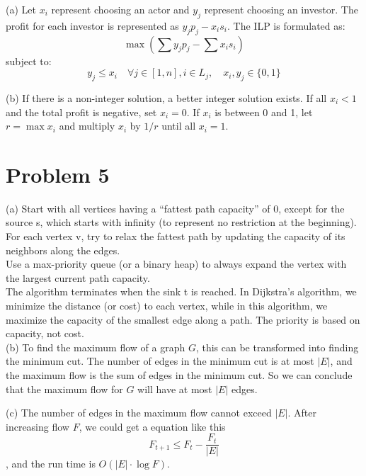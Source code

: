 \documentclass{article}
\begin{document}
(a) Let \( x_i \) represent choosing an actor and \( y_j \) represent choosing an investor. The profit for each investor is represented as \( y_j p_j - x_i s_i \). The ILP is formulated as:
\[
\max \left( \sum y_j p_j - \sum x_i s_i \right)
\]
subject to:
\[
y_j \leq x_i \quad \forall j \in [1, n], i \in L_j, \quad x_i, y_j \in \{0, 1\}
\]

(b) If there is a non-integer solution, a better integer solution exists. If all \( x_i < 1 \) and the total profit is negative, set \( x_i = 0 \). If \( x_i \) is between 0 and 1, let \( r = \max x_i \) and multiply \( x_i \) by \( 1/r \) until all \( x_i = 1 \).

\section*{Problem 5}

(a) Start with all vertices having a “fattest path capacity” of 0, except for the source s, which starts with infinity (to represent no restriction at the beginning).\\
For each vertex v, try to relax the fattest path by updating the capacity of its neighbors along the edges.\\
Use a max-priority queue (or a binary heap) to always expand the vertex with the largest current path capacity.\\
The algorithm terminates when the sink t is reached.
In Dijkstra’s algorithm, we minimize the distance (or cost) to each vertex, while in this algorithm, we maximize the capacity of the smallest edge along a path. The priority is based on capacity, not cost.\\

(b) To find the maximum flow of a graph \( G \), this can be transformed into finding the minimum cut. The number of edges in the minimum cut is at most \( |E| \), and the maximum flow is the sum of edges in the minimum cut. So we can conclude that the maximum flow for $G$ will have at most \( |E| \) edges.

(c) The number of edges in the maximum flow cannot exceed \( |E| \). After increasing flow \( F \), we could get a equation like this 
    \[F_{t+1}\leq F_t-\frac{F_t}{|E|}\]
, and the run time is \( O(|E| \cdot \log F) \).
\end{document}
